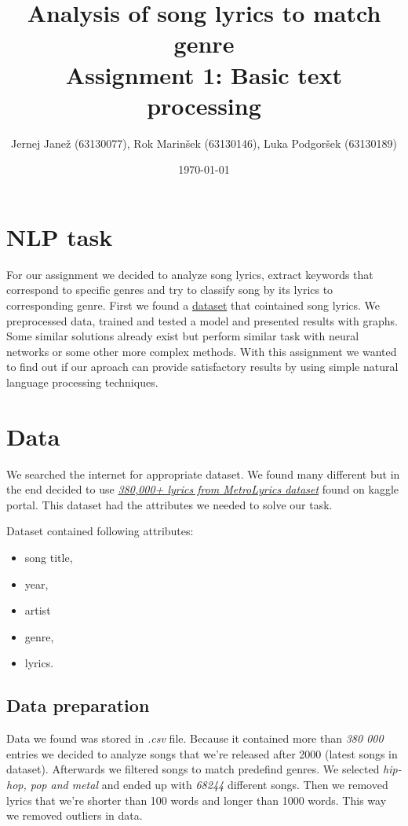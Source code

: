 \documentclass[a4paper,11pt]{article}
\title{%
Analysis of song lyrics to match genre \\
\large Assignment 1: Basic text processing}
\author{Jernej Janež (63130077), Rok Marinšek (63130146), Luka Podgoršek (63130189)}
\date{\today}
\begin{document}
\maketitle

\section{NLP task}
For our assignment we decided to analyze song lyrics, extract keywords that correspond to specific genres and try to classify song by its lyrics to corresponding genre. First we found a \href{https://www.kaggle.com/gyani95/380000-lyrics-from-metrolyrics}{dataset} that cointained song lyrics. We preprocessed data, trained and tested a model and presented results with graphs. Some similar solutions already exist but perform similar task with neural networks or some other more complex methods. With this assignment we wanted to find out if our aproach can provide satisfactory results by using simple natural language processing techniques.

\section{Data}
We searched the internet for appropriate dataset. We found many different but in the end decided to use \href{https://www.kaggle.com/gyani95/380000-lyrics-from-metrolyrics}{\textit{380,000+ lyrics from MetroLyrics dataset}} found on kaggle portal. This dataset had the attributes we needed to solve our task.

\noindent Dataset contained following attributes:
\begin{itemize}
\item song title,
\item year,
\item artist
\item genre,
\item lyrics.
\end{itemize}

\subsection{Data preparation}
Data we found was stored in \textit{.csv} file. Because it contained more than \textit{380 000} entries we decided to analyze songs that we're released after 2000 (latest songs in dataset). Afterwards we filtered songs to match predefind genres. We selected \textit{hip-hop, pop  and metal} and ended up with \textit{68244} different songs. Then we removed lyrics that we're shorter than 100 words and longer than 1000 words. This way we removed outliers in data.
\end{document}
